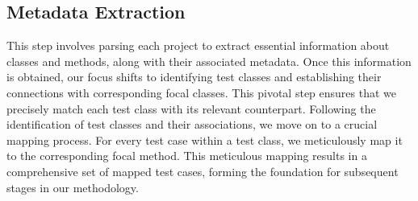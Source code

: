 \vspace{0.1 cm}
\subsection{Metadata Extraction}
\label{sec:data_extraction}
\vspace{0.1 cm}

This step involves parsing each project to extract essential information about classes and methods, along with their associated metadata. Once this information is obtained, our focus shifts to identifying test classes and establishing their connections with corresponding focal classes. This pivotal step ensures that we precisely match each test class with its relevant counterpart. Following the identification of test classes and their associations, we move on to a crucial mapping process. For every test case within a test class, we meticulously map it to the corresponding focal method. This meticulous mapping results in a comprehensive set of mapped test cases, forming the foundation for subsequent stages in our methodology.

